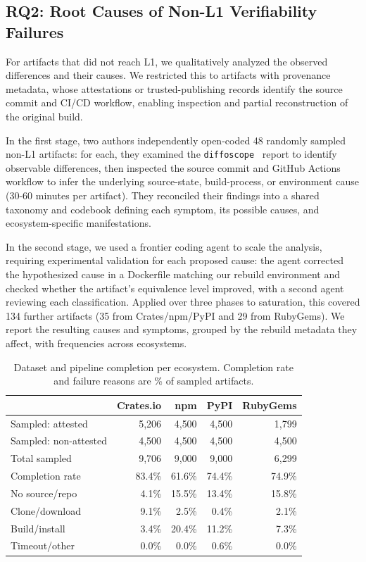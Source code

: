 \subsection{RQ2: Root Causes of Non-L1 Verifiability Failures}


For artifacts that did not reach L1, we qualitatively analyzed the observed differences and their causes. We restricted this to artifacts with provenance metadata, whose attestations or trusted-publishing records identify the source commit and CI/CD workflow, enabling inspection and partial reconstruction of the original build.

In the first stage, two authors independently open-coded 48 randomly sampled non-L1 artifacts: for each, they examined the \texttt{diffoscope}~\cite{diffoscope} report to identify observable differences, then inspected the source commit and GitHub
Actions workflow to infer the underlying source-state, build-process, or environment cause (30-60 minutes per artifact). They reconciled their findings into a shared taxonomy and codebook defining each symptom, its possible causes, and ecosystem-specific manifestations.

In the second stage, we used a frontier coding agent to scale the analysis, requiring experimental validation for each proposed cause: the agent corrected the hypothesized cause in a Dockerfile matching our rebuild environment and
checked whether the artifact's equivalence level improved, with a second agent reviewing each classification. Applied over three phases to saturation, this covered 134 further artifacts (35 from Crates/npm/PyPI and 29 from RubyGems). We report the resulting causes
and symptoms, grouped by the rebuild metadata they affect, with frequencies across ecosystems.

\begin{table}[t]
\caption{Dataset and pipeline completion per ecosystem. Completion rate and failure reasons are \% of sampled artifacts.}
\label{tab:dataset-and-completion}
\centering
\begin{tabular}{lrrrr}
\toprule
 & Crates.io & npm & PyPI & RubyGems \\
\midrule
Sampled: attested       & 5{,}206 & 4{,}500 & 4{,}500 & 1{,}799 \\
Sampled: non-attested   & 4{,}500 & 4{,}500 & 4{,}500 & 4{,}500 \\
Total sampled           & 9{,}706 & 9{,}000 & 9{,}000 & 6{,}299 \\
\midrule
\;Completion rate         & 83.4\%  & 61.6\%  & 74.4\%  & 74.9\%  \\
\;\;\;\;No source/repo        & 4.1\%   & 15.5\%  & 13.4\%  & 15.8\%  \\
\;\;\;\;Clone/download        & 9.1\%   & 2.5\%   & 0.4\%   & 2.1\%   \\
\;\;\;\;Build/install         & 3.4\%   & 20.4\%  & 11.2\%  & 7.3\%   \\
\;\;\;\;Timeout/other         & 0.0\%   & 0.0\%   & 0.6\%   & 0.0\%   \\
\bottomrule
\end{tabular}
\end{table}

